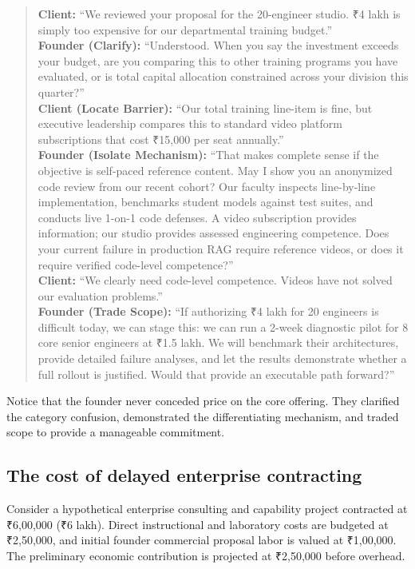 \begin{quote}
\textbf{Client:} ``We reviewed your proposal for the 20-engineer studio. ₹4 lakh is simply too expensive for our departmental training budget.''\\[0.5ex]
\textbf{Founder (Clarify):} ``Understood. When you say the investment exceeds your budget, are you comparing this to other training programs you have evaluated, or is total capital allocation constrained across your division this quarter?''\\[0.5ex]
\textbf{Client (Locate Barrier):} ``Our total training line-item is fine, but executive leadership compares this to standard video platform subscriptions that cost ₹15,000 per seat annually.''\\[0.5ex]
\textbf{Founder (Isolate Mechanism):} ``That makes complete sense if the objective is self-paced reference content. May I show you an anonymized code review from our recent cohort? Our faculty inspects line-by-line implementation, benchmarks student models against test suites, and conducts live 1-on-1 code defenses. A video subscription provides information; our studio provides assessed engineering competence. Does your current failure in production RAG require reference videos, or does it require verified code-level competence?''\\[0.5ex]
\textbf{Client:} ``We clearly need code-level competence. Videos have not solved our evaluation problems.''\\[0.5ex]
\textbf{Founder (Trade Scope):} ``If authorizing ₹4 lakh for 20 engineers is difficult today, we can stage this: we can run a 2-week diagnostic pilot for 8 core senior engineers at ₹1.5 lakh. We will benchmark their architectures, provide detailed failure analyses, and let the results demonstrate whether a full rollout is justified. Would that provide an executable path forward?''
\end{quote}
Notice that the founder never conceded price on the core offering. They clarified the category confusion, demonstrated the differentiating mechanism, and traded scope to provide a manageable commitment.

\subsection{The cost of delayed enterprise contracting}

Consider a hypothetical enterprise consulting and capability project contracted at ₹6,00,000 (₹6 lakh). Direct instructional and laboratory costs are budgeted at ₹2,50,000, and initial founder commercial proposal labor is valued at ₹1,00,000. The preliminary economic contribution is projected at ₹2,50,000 before overhead.

